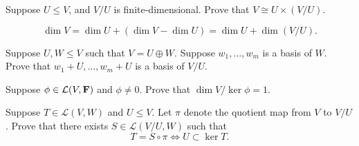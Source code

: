 \begin{exercise}
Suppose $U\le V$, and $V/U$ is finite-dimensional. Prove that $V\cong U\times(V/U)$.
\end{exercise}

\begin{solution}
\[\dim V=\dim U+(\dim V-\dim U)=\dim U+\dim(V/U).\]
\end{solution}

\begin{exercise}
Suppose $U,W\le V$ such that $V=U\oplus W$. Suppose $w_1,\dots,w_m$ is a basis of $W$. Prove that $w_1+U,\dots,w_m+U$ is a basis of $V/U$.
\end{exercise}

\begin{exercise}

\end{exercise}

\begin{exercise}
 Suppose $\phi\in\mathcal{L}(V,\mathbf F)$ and $\phi\neq0$. Prove that $\dim V/\ker\phi=1$.
\end{exercise}

\begin{exercise}

\end{exercise}

\begin{exercise}
Suppose $T\in\mathcal{L}(V,W)$ and $U\le V$. Let $\pi$ denote the quotient map from $V$ to $V/U$. Prove that there exists $S\in\mathcal{L}(V/U,W)$ such that
\[T=S\circ\pi\iff U\subset\ker T.\]
\end{exercise}